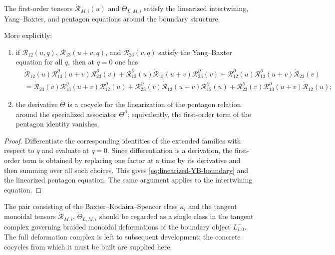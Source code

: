 \begin{theorem}
\ClaimStatusProvedHere
\label{thm:linearized-boundary-equations}
The first-order tensors
$\dot{\mathscr R}_{M,i}(u)$ and $\dot\Theta_{L,M,i}$ satisfy the
linearized intertwining, Yang--Baxter, and pentagon equations around the
boundary structure.

More explicitly:
\begin{enumerate}
 \item if $\mathscr R_{12}(u,q)$,
 $\mathscr R_{13}(u+v,q)$, and $\mathscr R_{23}(v,q)$ satisfy the
 Yang--Baxter equation for all $q$, then at $q=0$ one has
 \begin{align}
 &\dot{\mathscr R}_{12}(u)
 \mathscr R^{\partial}_{13}(u+v)
 \mathscr R^{\partial}_{23}(v)
 +
 \mathscr R^{\partial}_{12}(u)
 \dot{\mathscr R}_{13}(u+v)
 \mathscr R^{\partial}_{23}(v)
 +
 \mathscr R^{\partial}_{12}(u)
 \mathscr R^{\partial}_{13}(u+v)
 \dot{\mathscr R}_{23}(v)
 \nonumber\\
 &=
 \dot{\mathscr R}_{23}(v)
 \mathscr R^{\partial}_{13}(u+v)
 \mathscr R^{\partial}_{12}(u)
 +
 \mathscr R^{\partial}_{23}(v)
 \dot{\mathscr R}_{13}(u+v)
 \mathscr R^{\partial}_{12}(u)
 +
 \mathscr R^{\partial}_{23}(v)
 \mathscr R^{\partial}_{13}(u+v)
 \dot{\mathscr R}_{12}(u);
 \label{eq:linearized-YB-boundary}
 \end{align}
 \item the derivative $\dot\Theta$ is a cocycle for the linearization
 of the pentagon relation around the specialized associator
 $\Theta^{\partial}$; equivalently, the first-order term of the
 pentagon identity vanishes.
\end{enumerate}
\end{theorem}

\begin{proof}
Differentiate the corresponding identities of the extended families with
respect to $q$ and evaluate at $q=0$. Since differentiation is a
derivation, the first-order term is obtained by replacing one factor at a
time by its derivative and then summing over all such choices. This gives
\eqref{eq:linearized-YB-boundary} and the linearized pentagon equation.
The same argument applies to the intertwining equation.
\end{proof}

\begin{remark}
\label{rem:boundary-deformation-complex}
The pair consisting of the Baxter--Kodaira--Spencer class $\kappa_i$ and
the tangent monoidal tensors $\dot{\mathscr R}_{M,i}$,
$\dot\Theta_{L,M,i}$ should be regarded as a single class in the tangent
complex governing braided monoidal deformations of the boundary object
$L^-_{i,0}$. The full deformation complex is left to subsequent
development; the concrete cocycles from which it must be built are
supplied here.
\end{remark}

